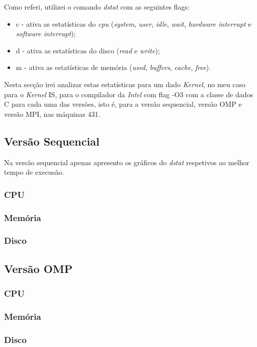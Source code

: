 \documentclass[conference,compsoc]{IEEEtran}
\begin{document}
Como referi, utilizei o comando \textit{dstat} com as seguintes flags:
\begin{itemize}
\item c - ativa as estatísticas do \textit{cpu} (\textit{system}, \textit{user}, \textit{idle}, \textit{wait}, \textit{hardware interrupt} e \textit{software interrupt});
\item d - ativa as estatísticas do disco (\textit{read} e \textit{write});
\item m - ativa as estatísticas de memória (\textit{used}, \textit{buffers}, \textit{cache}, \textit{free}).
\end{itemize}

Nesta secção irei analizar estas estatísticas para um dado \textit{Kernel}, no meu caso para o \textit{Kernel} IS, para o compilador da \textit{Intel} com flag -O3 com a classe de dados C para cada uma das versões, isto é, para a versão sequencial, versão OMP e versão MPI, nas máquinas 431.

\subsection{Versão Sequencial}
Na versão sequencial apenas apresento os gráficos do \textit{dstat} respetivos ao melhor tempo de execusão.
\subsubsection{CPU}
\subsubsection{Memória}
\subsubsection{Disco}
\subsection{Versão OMP}
\subsubsection{CPU}
\subsubsection{Memória}
\subsubsection{Disco}
\end{document}
